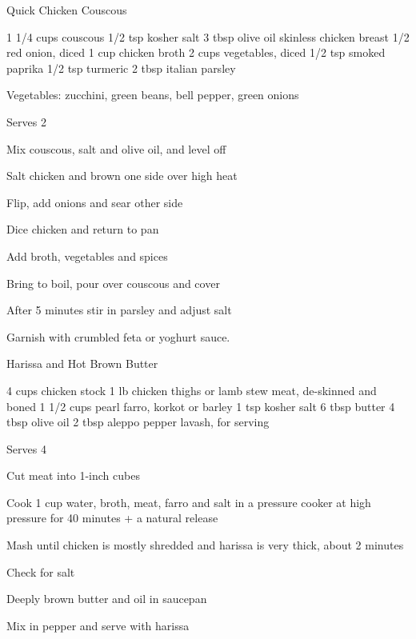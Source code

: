 \begin{denserecipe}{Quick Chicken Couscous}{}
\begin{ingredients}
1 1/4 cups couscous
1/2 tsp kosher salt
3 tbsp olive oil
skinless chicken breast
1/2 red onion, diced
1 cup chicken broth
2 cups vegetables, diced
1/2 tsp smoked paprika
1/2 tsp turmeric
2 tbsp italian parsley
\end{ingredients}
\nextcolumn
Vegetables: zucchini, green beans, bell pepper, green onions

Serves 2
\begin{steps}
    \item Mix couscous, salt and olive oil, and level off
    \item Salt chicken and brown one side over high heat
    \item Flip, add onions and sear other side
    \item Dice chicken and return to pan
    \item Add broth, vegetables and spices
    \item Bring to boil, pour over couscous and cover
    \item After 5 minutes stir in parsley and adjust salt
\end{steps}
Garnish with crumbled feta or yoghurt sauce.
\end{denserecipe}

\begin{recipe}{Harissa and Hot Brown Butter}{}
\begin{ingredients}
4 cups chicken stock
1 lb chicken thighs or lamb stew meat, de-skinned and boned
1 1/2 cups pearl farro, korkot or barley
1 tsp kosher salt
6 tbsp butter
4 tbsp olive oil
2 tbsp aleppo pepper
lavash, for serving
\end{ingredients}
\nextcolumn
Serves 4
\begin{steps}
    \item Cut meat into 1-inch cubes
    \item Cook 1 cup water, broth, meat, farro and salt in a pressure cooker at high pressure for 40 minutes + a natural release
    \item Mash until chicken is mostly shredded and harissa is very thick, about 2 minutes
    \item Check for salt
    \item Deeply brown butter and oil in saucepan
    \item Mix in pepper and serve with harissa
\end{steps}
\end{recipe}

